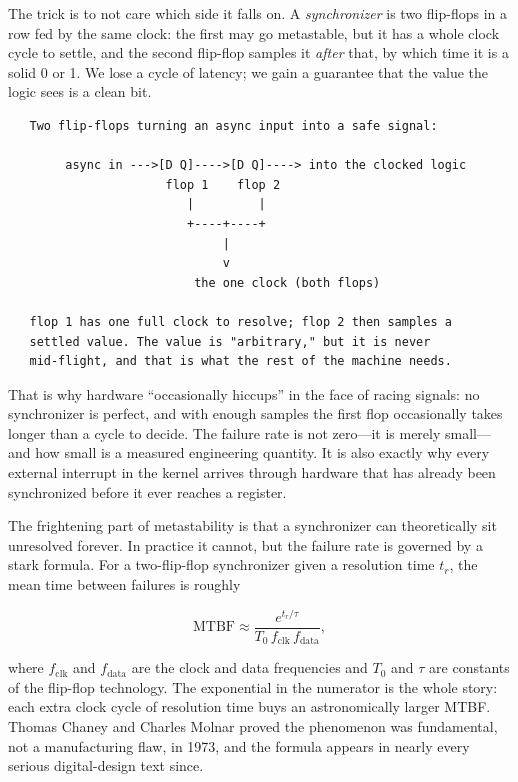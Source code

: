 The trick is to not care which side it falls on. A
\emph{synchronizer} is two flip-flops in a row fed by the same clock:
the first may go metastable, but it has a whole clock cycle to settle,
and the second flip-flop samples it \emph{after} that, by which time
it is a solid 0 or 1. We lose a cycle of latency; we gain a guarantee
that the value the logic sees is a clean bit.

\begin{verbatim}
   Two flip-flops turning an async input into a safe signal:

        async in --->[D Q]---->[D Q]----> into the clocked logic
                      flop 1    flop 2
                         |         |
                         +----+----+
                              |
                              v
                          the one clock (both flops)

   flop 1 has one full clock to resolve; flop 2 then samples a
   settled value. The value is "arbitrary," but it is never
   mid-flight, and that is what the rest of the machine needs.
\end{verbatim}

That is why hardware ``occasionally hiccups'' in the face of racing
signals: no synchronizer is perfect, and with enough samples the
first flop occasionally takes longer than a cycle to decide. The
failure rate is not zero---it is merely small---and how small is a
measured engineering quantity. It is also exactly why every external
interrupt in the kernel arrives through hardware that has already
been synchronized before it ever reaches a register.

\begin{researchnote}
The frightening part of metastability is that a synchronizer can
theoretically sit unresolved forever. In practice it cannot, but the
failure rate is governed by a stark formula. For a two-flip-flop
synchronizer given a resolution time $t_r$, the mean time between
failures is roughly

\begin{equation}
\text{MTBF} \approx \frac{e^{t_r / \tau}}{T_0\, f_\text{clk}\, f_\text{data}},
\end{equation}

where $f_\text{clk}$ and $f_\text{data}$ are the clock and data
frequencies and $T_0$ and $\tau$ are constants of the flip-flop
technology. The exponential in the numerator is the whole story:
each extra clock cycle of resolution time buys an astronomically
larger MTBF. Thomas Chaney and Charles Molnar proved the phenomenon
was fundamental, not a manufacturing flaw, in 1973, and the formula
appears in nearly every serious digital-design text since.

\end{researchnote}

